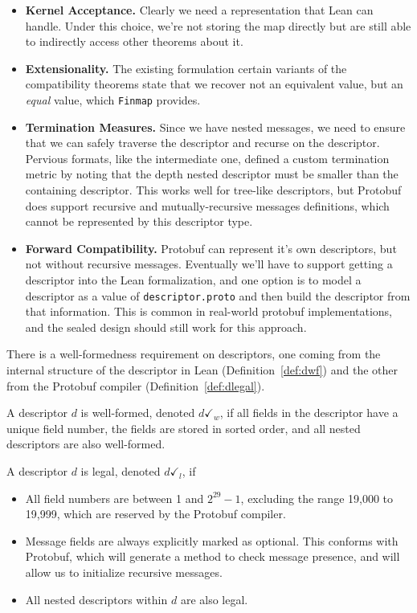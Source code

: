\begin{itemize}
\item \textbf{Kernel Acceptance.} Clearly we need a representation that Lean can
  handle. Under this choice, we're not storing the map directly but are still
  able to indirectly access other theorems about it.
\item \textbf{Extensionality.} The existing formulation certain variants of the
  compatibility theorems state that we recover not an equivalent value, but an
  \emph{equal} value, which \texttt{Finmap} provides.
\item \textbf{Termination Measures.} Since we have nested messages, we need to
  ensure that we can safely traverse the descriptor and recurse on the
  descriptor. Pervious formats, like the intermediate one, defined a custom
  termination metric by noting that the depth nested descriptor must be smaller
  than the containing descriptor. This works well for tree-like descriptors, but
  Protobuf does support recursive and mutually-recursive messages definitions,
  which cannot be represented by this descriptor type.
\item \textbf{Forward Compatibility.} Protobuf can represent it's own
  descriptors, but not without recursive messages. Eventually we'll have to
  support getting a descriptor into the Lean formalization, and one option is to
  model a descriptor as a value of \texttt{descriptor.proto} and then build the
  descriptor from that information. This is common in real-world protobuf
  implementations, and the sealed design should still work for this approach.
\end{itemize}

There is a well-formedness requirement on descriptors, one coming from the
internal structure of the descriptor in Lean (Definition~\ref{def:dwf}) and the
other from the Protobuf compiler (Definition~\ref{def:dlegal}).

\vspace{1em}
\begin{definition}\label{def:dwf}
  A descriptor $d$ is well-formed, denoted $d \checkmark_w$, if all fields in
  the descriptor have a unique field number, the fields are stored in sorted
  order, and all nested descriptors are also well-formed.
\end{definition}

\vspace{1em}
\begin{definition}\label{def:dlegal}
  A descriptor $d$ is legal, denoted $d \checkmark_l$, if
  \begin{itemize}
  \item All field numbers are between 1 and $2^{29}-1$, excluding the range
    19,000 to 19,999, which are reserved by the Protobuf compiler.
  \item Message fields are always explicitly marked as optional. This conforms
    with Protobuf, which will generate a method to check message presence, and
    will allow us to initialize recursive messages.
  \item All nested descriptors within $d$ are also legal.
  \end{itemize}
\end{definition}

